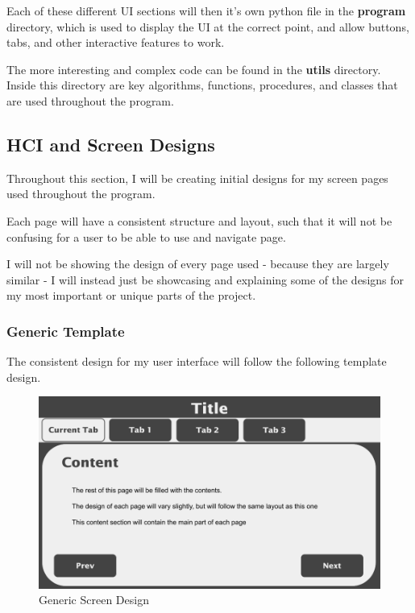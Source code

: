 \documentclass{article}
\begin{document}
Each of these different UI sections will then it's own python file in the \textbf{program} directory, which is used to display the UI at the correct point, and allow buttons, tabs, and other interactive features to work.

The more interesting and complex code can be found in the \textbf{utils} directory. Inside this directory are key algorithms, functions, procedures, and classes that are used throughout the program.

\clearpage

\subsection{HCI and Screen Designs}
Throughout this section, I will be creating initial designs for my screen pages used throughout the program.

Each page will have a consistent structure and layout, such that it will not be confusing for a user to be able to use and navigate page.

I will not be showing the design of every page used - because they are largely similar - I will instead just be showcasing and explaining some of the designs for my most important or unique parts of the project.

\subsubsection{Generic Template}
The consistent design for my user interface will follow the following template design.

\begin{figure}[ht]
    \centering
    \includegraphics[scale=0.3]{template-screen-design}
    \caption{Generic Screen Design}
\end{figure}
\end{document}
